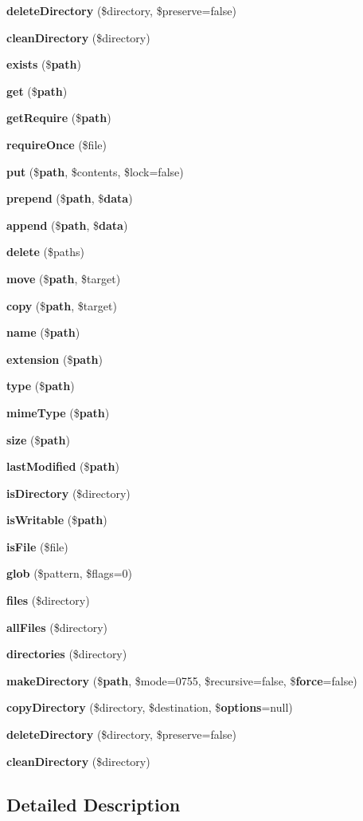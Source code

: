 \begin{DoxyCompactItemize}
\item 
{\bf delete\+Directory} (\$directory, \$preserve=false)
\item 
{\bf clean\+Directory} (\$directory)
\item 
{\bf exists} (\${\bf path})
\item 
{\bf get} (\${\bf path})
\item 
{\bf get\+Require} (\${\bf path})
\item 
{\bf require\+Once} (\$file)
\item 
{\bf put} (\${\bf path}, \$contents, \$lock=false)
\item 
{\bf prepend} (\${\bf path}, \${\bf data})
\item 
{\bf append} (\${\bf path}, \${\bf data})
\item 
{\bf delete} (\$paths)
\item 
{\bf move} (\${\bf path}, \$target)
\item 
{\bf copy} (\${\bf path}, \$target)
\item 
{\bf name} (\${\bf path})
\item 
{\bf extension} (\${\bf path})
\item 
{\bf type} (\${\bf path})
\item 
{\bf mime\+Type} (\${\bf path})
\item 
{\bf size} (\${\bf path})
\item 
{\bf last\+Modified} (\${\bf path})
\item 
{\bf is\+Directory} (\$directory)
\item 
{\bf is\+Writable} (\${\bf path})
\item 
{\bf is\+File} (\$file)
\item 
{\bf glob} (\$pattern, \$flags=0)
\item 
{\bf files} (\$directory)
\item 
{\bf all\+Files} (\$directory)
\item 
{\bf directories} (\$directory)
\item 
{\bf make\+Directory} (\${\bf path}, \$mode=0755, \$recursive=false, \${\bf force}=false)
\item 
{\bf copy\+Directory} (\$directory, \$destination, \${\bf options}=null)
\item 
{\bf delete\+Directory} (\$directory, \$preserve=false)
\item 
{\bf clean\+Directory} (\$directory)
\end{DoxyCompactItemize}


\subsection{Detailed Description}


